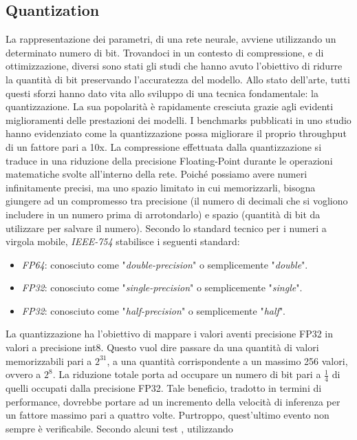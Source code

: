 \subsection{Quantization}
La rappresentazione dei parametri, di una rete neurale, avviene utilizzando 
un determinato numero di bit. Trovandoci in un contesto di compressione, e 
di ottimizzazione, diversi sono stati gli studi che hanno avuto l'obiettivo di 
ridurre la quantità di bit preservando l'accuratezza del modello. Allo stato 
dell'arte, tutti questi sforzi hanno dato vita allo sviluppo di una tecnica 
fondamentale: la quantizzazione. La sua popolarità è rapidamente cresciuta 
grazie agli evidenti miglioramenti delle prestazioni dei modelli. I benchmarks 
pubblicati in uno studio \cite{quantization_speed} hanno evidenziato come la quantizzazione possa 
migliorare il proprio throughput di un fattore pari a 10x. La compressione 
effettuata dalla quantizzazione si traduce in una riduzione della precisione 
Floating-Point durante le operazioni matematiche svolte all'interno della 
rete. Poiché possiamo avere numeri infinitamente precisi, ma uno spazio 
limitato in cui memorizzarli, bisogna giungere ad un compromesso tra 
precisione (il numero di decimali che si vogliono includere in un numero 
prima di arrotondarlo) e spazio (quantità di bit da utilizzare per salvare 
il numero). Secondo lo standard tecnico per i numeri a virgola mobile, 
\emph{IEEE-754} stabilisce i seguenti standard:
\begin{itemize}
    \item \emph{FP64}: conosciuto come "\emph{double-precision}" o semplicemente "\emph{double}". 
    \item \emph{FP32}: conosciuto come "\emph{single-precision}" o semplicemente "\emph{single}".
    \item \emph{FP32}: conosciuto come "\emph{half-precision}" o semplicemente "\emph{half}".
\end{itemize}
La quantizzazione ha l'obiettivo di mappare i valori aventi precisione FP32 
in valori a precisione int8. Questo vuol dire passare da una quantità di valori 
memorizzabili pari a $2^{31}$, a una quantità  corrispondente a un massimo 256 
valori, ovvero a $2^8$. La riduzione totale porta ad occupare un numero di bit 
pari a $\frac{1}{4}$ di quelli occupati dalla precisione FP32. Tale beneficio, tradotto in 
termini di performance, dovrebbe portare ad un incremento della velocità di 
inferenza per un fattore massimo pari a quattro volte. Purtroppo, quest'ultimo 
evento non sempre è verificabile. Secondo alcuni test \cite{LIANG2021370}, utilizzando 
